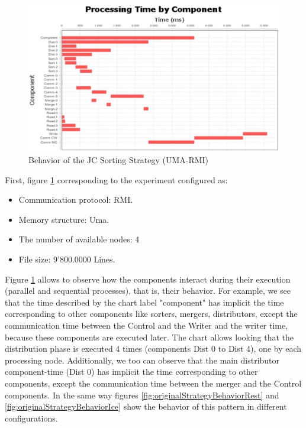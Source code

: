 \begin{figure}[H]
	\centering
	\includegraphics[trim=0.5cm 0cm -5cm 0cm, scale=0.74]{fig/JCUmaRmi498Behavior.eps}
	\caption{Behavior of the JC Sorting Strategy (UMA-RMI)}
	\label{fig:originalStrategyBehaviorRmi}
\end{figure}

First, figure \ref{fig:originalStrategyBehaviorRmi} corresponding to the experiment configured as: 
\begin{itemize}
	\item Communication protocol: RMI.
	\item  Memory structure: Uma.
	\item The number of available nodes: 4
	\item File size: 9'800.0000 Lines.
\end{itemize}
	
Figure \ref{fig:originalStrategyBehaviorRmi} allows to observe how the components interact during their execution (parallel and sequential processes), that is, their behavior. For example, we see that the time described by the chart label "component" has implicit the time corresponding to other components like sorters, mergers, distributors, except the communication time between the Control and the Writer and the writer time, because these components are executed later. The chart allows looking that the distribution phase is executed 4 times (components Dist 0 to Dist 4), one by each processing node. Additionally, we too can observe that the main distributor component-time (Dist 0) has implicit the time corresponding to other components, except the communication time between the merger and the Control components. In the same way figures \ref{fig:originalStrategyBehaviorRest} and \ref{fig:originalStrategyBehaviorIce} show the behavior of this pattern in different configurations.
	
